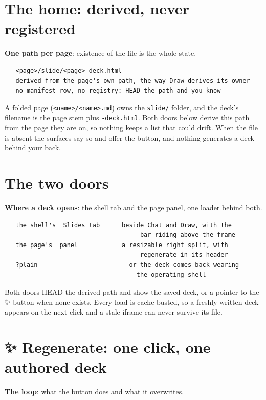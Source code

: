 
\section{The home: derived, never registered}
\textbf{One path per page}: existence of the file is the whole state.

\begin{verbatim}
   <page>/slide/<page>-deck.html
   derived from the page's own path, the way Draw derives its owner
   no manifest row, no registry: HEAD the path and you know
\end{verbatim}
A folded page (\texttt{<name>/<name>.md}) owns the \texttt{slide/} folder, and the deck's filename is the page stem plus \texttt{-deck.html}. Both doors below derive this path from the page they are on, so nothing keeps a list that could drift. When the file is absent the surfaces say so and offer the button, and nothing generates a deck behind your back.


\section{The two doors}
\textbf{Where a deck opens}: the shell tab and the page panel, one loader behind both.

\begin{verbatim}
   the shell's  Slides tab      beside Chat and Draw, with the
                                     bar riding above the frame
   the page's  panel            a resizable right split, with
                                     regenerate in its header
   ?plain                         or the deck comes back wearing
                                    the operating shell
\end{verbatim}
Both doors HEAD the derived path and show the saved deck, or a pointer to the ✨ button when none exists. Every load is cache-busted, so a freshly written deck appears on the next click and a stale iframe can never survive its file.


\section{✨ Regenerate: one click, one authored deck}
\textbf{The loop}: what the button does and what it overwrites.

